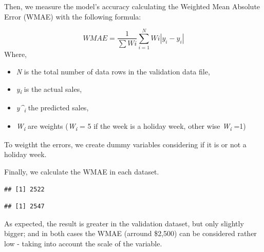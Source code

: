 \documentclass[11pt,]{article}
\newenvironment{Shaded}{\begin{snugshade}}{\end{snugshade}}
\newcommand{\KeywordTok}[1]{\textcolor[rgb]{0.13,0.29,0.53}{\textbf{{#1}}}}
\newcommand{\StringTok}[1]{\textcolor[rgb]{0.31,0.60,0.02}{{#1}}}
\newcommand{\CommentTok}[1]{\textcolor[rgb]{0.56,0.35,0.01}{\textit{{#1}}}}
\newcommand{\NormalTok}[1]{{#1}}
\providecommand{\tightlist}{%
  \setlength{\itemsep}{0pt}\setlength{\parskip}{0pt}}
\begin{document}
Then, we measure the model's accuracy calculating the Weighted Mean
Absolute Error (WMAE) with the following formula:

\[WMAE = \frac{1}{\sum{W}i}\sum_{i=1}^N{W}i\left\lvert{y_{i}-\hat{y}_{i}}\right\rvert\]
Where,

\begin{itemize}
\tightlist
\item
  \emph{N} is the total number of data rows in the validation data file,
\item
  \emph{y\textsubscript{i}} is the actual sales,
\item
  \emph{y\^{}\textsubscript{i}} the predicted sales,
\item
  \emph{W\textsubscript{i}} are weights (\emph{W\textsubscript{i}} = 5
  if the week is a holiday week, other wise \emph{W\textsubscript{i}}
  =1)
\end{itemize}

To weigtht the errors, we create dummy variables considering if it is or
not a holiday week.

Finally, we calculate the WMAE in each dataset.

\begin{Shaded}
\end{Shaded}

\begin{verbatim}
## [1] 2522
\end{verbatim}

\begin{Shaded}
\end{Shaded}

\begin{verbatim}
## [1] 2547
\end{verbatim}

As expected, the result is greater in the validation dataset, but only
slightly bigger; and in both cases the WMAE (arround \$2,500) can be
considered rather low - taking into account the scale of the variable.
\end{document}
